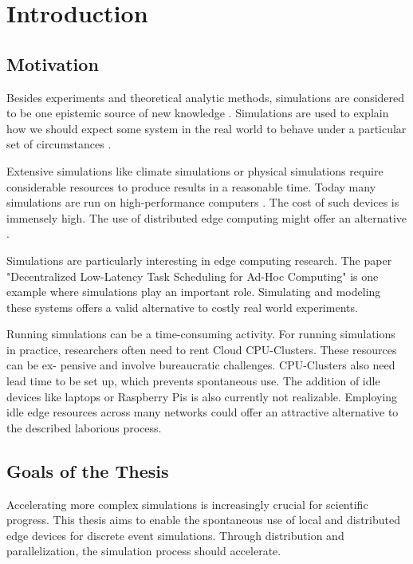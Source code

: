 \chapter{Introduction}

\section{Motivation}
\label{Motivation}

Besides experiments and theoretical analytic methods, simulations are considered to be one epistemic source of new knowledge \cite{standford:simulations}. Simulations are used to explain how we should expect some system in the real world to behave under a particular set of circumstances \cite{ingalls2011introduction}.

Extensive simulations like climate simulations or physical simulations \cite{10.1093/mnras/stt1403} require considerable resources to produce results in a reasonable time. Today many simulations are run on high-performance computers \cite{spataro2017high}. The cost of such devices is immensely high. The use of distributed edge computing might offer an alternative \cite{shi2016edge}.

Simulations are particularly interesting in edge computing research. The paper "Decentralized Low-Latency Task Scheduling for Ad-Hoc Computing" \cite{edinger2021decentralized} is one example where simulations play an important role. Simulating and modeling these systems offers a valid alternative to costly real world experiments.

Running simulations can be a time-consuming activity. For running simulations in practice, researchers often need to rent Cloud CPU-Clusters. These resources can be ex- pensive and involve bureaucratic challenges. CPU-Clusters also need lead time to be set up, which prevents spontaneous use. The addition of idle devices like laptops or Raspberry Pis is also currently not realizable. Employing idle edge resources across many networks could offer an attractive alternative to the described laborious process.


\section{Goals of the Thesis}
\label{Goals-of-the-Thesis}

Accelerating more complex simulations is increasingly crucial for scientific progress. This thesis aims to enable the spontaneous use of local and distributed edge devices for discrete event simulations. Through distribution and parallelization, the simulation process should accelerate.

